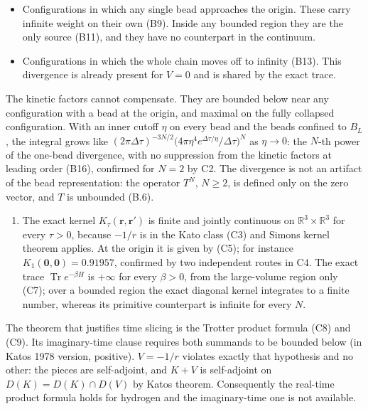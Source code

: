 \documentclass[11pt,a4paper]{article}
\providecommand{\tightlist}{\setlength{\itemsep}{0pt}\setlength{\parskip}{0pt}}
\begin{document}
\begin{itemize}
\tightlist
\item
  Configurations in which any single bead approaches the origin. These carry infinite weight on their own (B9). Inside any bounded region they are the only source (B11), and they have no counterpart in the continuum.
\item
  Configurations in which the whole chain moves off to infinity (B13). This divergence is already present for \(V=0\) and is shared by the exact trace.
\end{itemize}

The kinetic factors cannot compensate. They are bounded below near any configuration with a bead at the origin, and maximal on the fully collapsed configuration. With an inner cutoff \(\eta\) on every bead and the beads confined to \(B_L\), the integral grows like \((2\pi\Delta\tau)^{-3N/2}\big(4\pi\eta^4e^{\Delta\tau/\eta}/\Delta\tau\big)^N\) as \(\eta\to0\): the \(N\)-th power of the one-bead divergence, with no suppression from the kinetic factors at leading order (B16), confirmed for \(N=2\) by C2. The divergence is not an artifact of the bead representation: the operator \(T^N\), \(N\ge2\), is defined only on the zero vector, and \(T\) is unbounded (B.6).

\begin{enumerate}
\def\labelenumi{(\alph{enumi})}
\setcounter{enumi}{2}
\tightlist
\item
  The exact kernel \(K_\tau(\mathbf r,\mathbf r')\) is finite and jointly continuous on \(\mathbb R^3\times\mathbb R^3\) for every \(\tau>0\), because \(-1/r\) is in the Kato class (C3) and Simon\textquotesingle s kernel theorem applies. At the origin it is given by (C5); for instance \(K_1(\mathbf 0,\mathbf 0)=0.91957\), confirmed by two independent routes in C4. The exact trace \(\operatorname{Tr}e^{-\beta H}\) is \(+\infty\) for every \(\beta>0\), from the large-volume region only (C7); over a bounded region the exact diagonal kernel integrates to a finite number, whereas its primitive counterpart is infinite for every \(N\).
\end{enumerate}

The theorem that justifies time slicing is the Trotter product formula (C8) and (C9). Its imaginary-time clause requires both summands to be bounded below (in Kato\textquotesingle s 1978 version, positive). \(V=-1/r\) violates exactly that hypothesis and no other: the pieces are self-adjoint, and \(K+V\) is self-adjoint on \(D(K)=D(K)\cap D(V)\) by Kato\textquotesingle s theorem. Consequently the real-time product formula holds for hydrogen and the imaginary-time one is not available.
\end{document}
